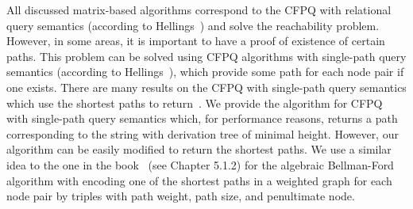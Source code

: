 All discussed matrix-based algorithms correspond to the CFPQ with relational query semantics (according to Hellings~\cite{hellingsRelational}) and solve the reachability problem. However, in some areas, it is important to have a proof of existence of certain paths. This problem can be solved using CFPQ algorithms with single-path query semantics (according to Hellings~\cite{hellingsPathQuerying}), which provide some path for each node pair if one exists. There are many results on the CFPQ with single-path query semantics which use the shortest paths to return~\cite{hellingsPathQuerying,barrett2000formal,bradford2007quickest,ward2010complexity}. We provide the algorithm for CFPQ with single-path query semantics which, for performance reasons, returns a path corresponding to the string with derivation tree of minimal height. However, our algorithm can be easily modified to return the shortest paths. We use a similar idea to the one in the book~\cite{kepner2011graph} (see Chapter 5.1.2) for the algebraic Bellman-Ford algorithm with encoding one of the shortest paths in a weighted graph for each node pair by triples with path weight, path size, and penultimate node.

